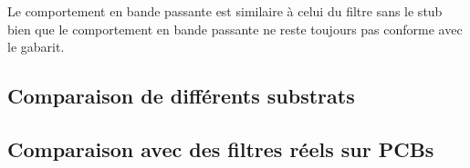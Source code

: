 \documentclass[french]{article}
\begin{document}
Le comportement en bande passante est similaire à celui du filtre sans le stub bien que le comportement en bande passante ne reste toujours pas conforme avec le gabarit.



\subsection{Comparaison de différents substrats}

\subsection{Comparaison avec des filtres réels sur PCBs}
\end{document}
